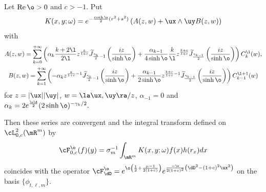 \begin{theorem}
\label{seriesholom}
Let $\operatorname{Re}\o>0$ and $c>-1$.
Put
\begin{gather*}K(x,y;\omega)=e^{-\frac{\coth{\o}}{2}(r^{2}+s^{2})}\left(A(z,w)+\ux\wedge\uy
B(z,w)\right)
\end{gather*} with
\begin{gather*}
A(z,w) = \sum_{k=0}^{+\infty} \left(\alpha_{k} \frac{k+2\l}{2\l} z^{\frac{k}{1+c}}
\widetilde{J}_{\frac{\gamma_{k}}{2}-1}\left(\frac{iz}{\sinh{\o}}\right) +\frac{
\alpha_{k-1}}{4\sinh{\o}} \frac{k}{\l} z^{\frac{k+c}{1+c}}
\widetilde{J}_{\frac{\gamma_{k-1}}{2}}\left(\frac{iz}{\sinh{\o}}\right)\right) C_{k}^{\l}(w),\\
B(z,w) = \sum_{k=1}^{+\infty} \left(-\alpha_{k} z^{\frac{k}{1+c}-1}
\widetilde{J}_{\frac{\gamma_{k}}{2}-1}\left(\frac{iz}{\sinh{\o}}\right) +
\frac{\alpha_{k-1}}{2\sinh{\o}} z^{\frac{k+c}{1+c}-1}
\widetilde{J}_{\frac{\gamma_{k-1}}{2}}\left(\frac{iz}{\sinh{\o}}\right)\right) C_{k-1}^{\l+1}(w)
\end{gather*}
for $z=|\ux||\uy|$, $w=\la\ux,\uy\ra/z$, $\alpha_{-1}=0$ and
$%
\alpha_{k}=2e^{\frac{\o\d}{2}}(2\sinh{\o})^{-\gamma_{k}/2}.
$%

Then these series are convergent and the integral transform defined on $\cL^{2}_{0,c}(\mR^{m})$ by
\begin{gather*}
\cF_{0,c}^{\o}(f)(y)=\sigma_{m}^{-1}\int_{\mR^{m}}K(x,y;\omega)f(x)h(r_{x})dx
\end{gather*}
coincides with the operator $\cF_{\dD}^{\o}=e^{\o\left(\frac{1}{2}+\frac{\mu-1}{2(1+c)}
\right)}e^{\frac{-\o}{2(1+c)^{2}}\left(\dD^{2}-(1+c)^{2}\ux^{2}\right)}$ on the basis $\{
\phi_{t,\ell,m}\}$.
\end{theorem}

